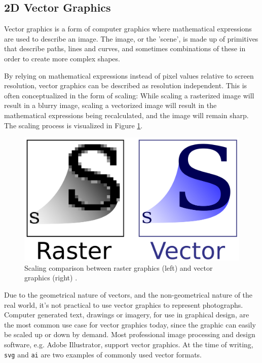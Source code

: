 \subsection{2D Vector Graphics}
Vector graphics is a form of computer graphics where mathematical expressions are used to describe an image.
The image, or the 'scene', is made up of primitives that describe paths, lines and curves, and sometimes combinations of these in order to create more complex shapes.

By relying on mathematical expressions instead of pixel values relative to screen resolution, vector graphics can be described as resolution independent.
This is often conceptualized in the form of scaling:
While scaling a rasterized image will result in a blurry image, scaling a vectorized image will result in the mathematical expressions being recalculated, and the image will remain sharp.
The scaling process is visualized in Figure \ref{fig:vectorscaling}.

\begin{figure}[h!]
\centering \includegraphics[width=0.5\linewidth]{images/bm_vs_svg.png}
\caption{Scaling comparison between raster graphics (left) and vector graphics (right) \cite{svg}.}
\label{fig:vectorscaling}
\end{figure}

Due to the geometrical nature of vectors, and the non-geometrical nature of the real world, it's not practical to use vector graphics to represent photographs.
Computer generated text, drawings or imagery, for use in graphical design, are the most common use case for vector graphics today, since the graphic can easily be scaled up or down by demand.
Most professional image processing and design software, e.g. Adobe Illustrator, support vector graphics.
At the time of writing, \texttt{svg} and \texttt{ai} are two examples of commonly used vector formats.


